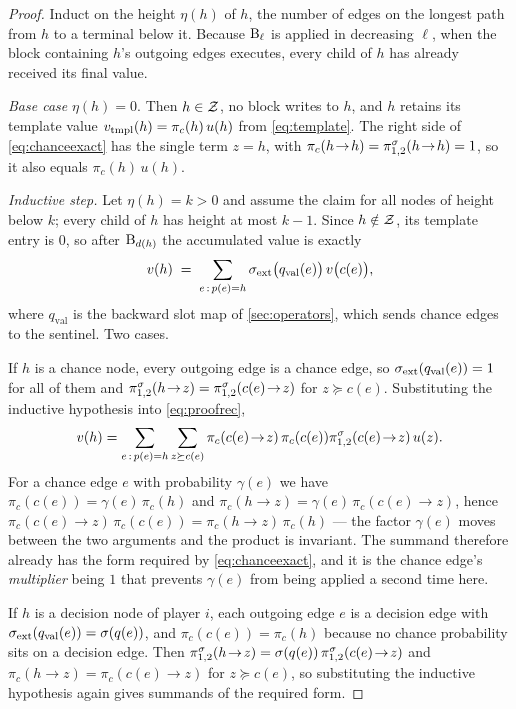 \begin{proof}
Induct on the height $\eta(h)$ of $h$, the number of edges on the longest path from $h$
to a terminal below it. Because $\mathrm{B}_\ell$ is applied in decreasing $\ell$, when the
block containing $h$'s outgoing edges executes, every child of $h$ has already received
its final value.

\emph{Base case} $\eta(h) = 0$. Then $h \in \mathcal{Z}$, no block writes to $h$, and $h$
retains its template value $v_{\mathrm{tmpl}}(h) = \pi_c(h)\, u(h)$ from
\cref{eq:template}. The right side of \cref{eq:chanceexact} has the single term
$z = h$, with $\pi_c(h \!\to\! h) = \pi^{\sigma}_{1,2}(h \!\to\! h) = 1$, so it also
equals $\pi_c(h)\,u(h)$.

\emph{Inductive step.} Let $\eta(h) = k > 0$ and assume the claim for all nodes of
height below $k$; every child of $h$ has height at most $k-1$. Since $h \notin \mathcal{Z}$,
its template entry is $0$, so after $\mathrm{B}_{d(h)}$ the accumulated value is exactly
\begin{equation}
    v(h) \;=\; \sum_{e \,:\, p(e) = h} \sigma_{\mathrm{ext}}\big(q_{\mathrm{val}}(e)\big)\, v\big(c(e)\big),
    \label{eq:proofrec}
\end{equation}
where $q_{\mathrm{val}}$ is the backward slot map of \cref{sec:operators}, which sends
chance edges to the sentinel. Two
cases.

If $h$ is a chance node, every outgoing edge is a chance edge, so
$\sigma_{\mathrm{ext}}(q_{\mathrm{val}}(e)) = 1$ for all of them and
$\pi^{\sigma}_{1,2}(h \!\to\! z) = \pi^{\sigma}_{1,2}(c(e) \!\to\! z)$ for
$z \succeq c(e)$. Substituting the inductive hypothesis into \cref{eq:proofrec},
\begin{equation*}
    v(h) = \sum_{e \,:\, p(e) = h} \sum_{z \succeq c(e)}
        \pi_c(c(e) \!\to\! z)\, \pi_c(c(e))
        \pi^{\sigma}_{1,2}(c(e) \!\to\! z)\, u(z).
\end{equation*}
For a chance edge $e$ with probability $\gamma(e)$ we have
$\pi_c(c(e)) = \gamma(e)\, \pi_c(h)$ and
$\pi_c(h \!\to\! z) = \gamma(e)\, \pi_c(c(e) \!\to\! z)$, hence
$\pi_c(c(e) \!\to\! z)\, \pi_c(c(e)) = \pi_c(h \!\to\! z)\, \pi_c(h)$ --- the factor
$\gamma(e)$ moves between the two arguments and the product is invariant. The summand
therefore already has the form required by \cref{eq:chanceexact}, and it is the chance
edge's \emph{multiplier} being $1$ that prevents $\gamma(e)$ from being applied a second
time here.

If $h$ is a decision node of player $i$, each outgoing edge $e$ is a decision edge with
$\sigma_{\mathrm{ext}}(q_{\mathrm{val}}(e)) = \sigma(q(e))$, and $\pi_c(c(e)) = \pi_c(h)$ because no
chance probability sits on a decision edge. Then
$\pi^{\sigma}_{1,2}(h \!\to\! z) = \sigma(q(e))\, \pi^{\sigma}_{1,2}(c(e) \!\to\! z)$
and $\pi_c(h \!\to\! z) = \pi_c(c(e) \!\to\! z)$ for $z \succeq c(e)$, so substituting
the inductive hypothesis again gives summands of the required form.


\end{proof}
